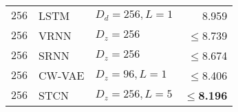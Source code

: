 {\begin{table}[t!]
\begin{tabular}{ll|lr}
        $256$      & LSTM                & $D_d=256, L=1$        & 8.959 \\  %
        $256$      & VRNN                & $D_z=256$             & $\leq$8.739 \\
        $256$      & SRNN                & $D_z=256$             & $\leq$8.674 \\
        $256$      & CW-VAE              & $D_z=96, L=1$         & $\leq$8.406 \\
        $256$      & STCN                & $D_z=256,L=5$  & $\leq$\textbf{8.196} \\
        \bottomrule
    \end{tabular}
    \vspace{2mm}
    \label{tab: timit likelihoods dmol linear appendix}
\end{table}


}
